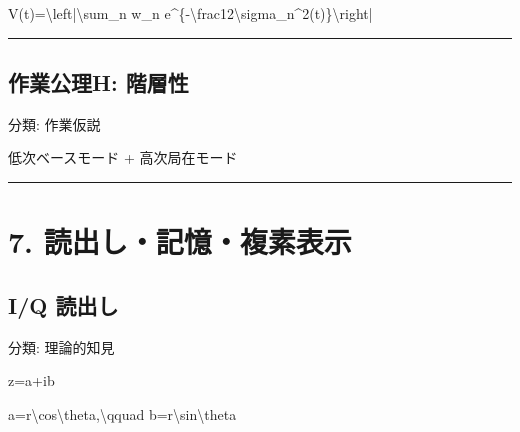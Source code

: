 \documentclass[
  a4paper,
]{ltjsarticle}
\newenvironment{Shaded}{}{}
\newcommand{\NormalTok}[1]{#1}
\begin{document}
\begin{Shaded}
\begin{Highlighting}[]
\NormalTok{V(t)=\textbackslash{}left|\textbackslash{}sum\_n w\_n e\^{}\{{-}\textbackslash{}frac12\textbackslash{}sigma\_n\^{}2(t)\}\textbackslash{}right|}
\end{Highlighting}
\end{Shaded}

\begin{center}\rule{0.5\linewidth}{0.5pt}\end{center}

\subsection{作業公理H:
階層性}\label{ux4f5cux696dux516cux7406h-ux968eux5c64ux6027}

分類: 作業仮説

\begin{Shaded}
\begin{Highlighting}[]
\NormalTok{低次ベースモード}
\NormalTok{+ 高次局在モード}
\end{Highlighting}
\end{Shaded}

\begin{center}\rule{0.5\linewidth}{0.5pt}\end{center}

\section{7.
読出し・記憶・複素表示}\label{ux8aadux51faux3057ux8a18ux61b6ux8907ux7d20ux8868ux793a}

\subsection{I/Q 読出し}\label{iq-ux8aadux51faux3057}

分類: 理論的知見

\begin{Shaded}
\begin{Highlighting}[]
\NormalTok{z=a+ib}
\end{Highlighting}
\end{Shaded}

\begin{Shaded}
\begin{Highlighting}[]
\NormalTok{a=r\textbackslash{}cos\textbackslash{}theta,\textbackslash{}qquad b=r\textbackslash{}sin\textbackslash{}theta}
\end{Highlighting}
\end{Shaded}
\end{document}
